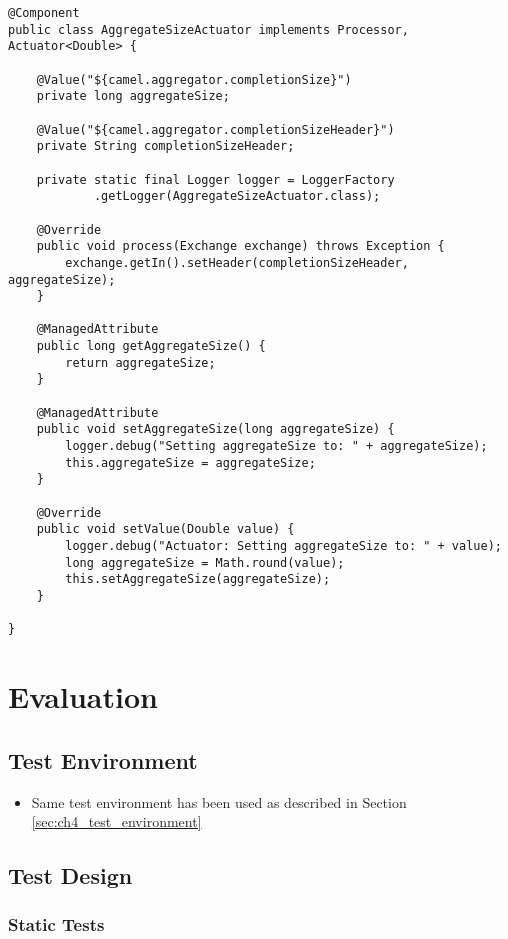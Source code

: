 \begin{lstlisting}[caption={AggregateSizeActuator},label=listing:ch5_aggregateSizeActuator]
@Component
public class AggregateSizeActuator implements Processor, Actuator<Double> {

	@Value("${camel.aggregator.completionSize}")
	private long aggregateSize;
	
	@Value("${camel.aggregator.completionSizeHeader}")
	private String completionSizeHeader;
	
	private static final Logger logger = LoggerFactory
			.getLogger(AggregateSizeActuator.class);
	
	@Override
	public void process(Exchange exchange) throws Exception {
		exchange.getIn().setHeader(completionSizeHeader, aggregateSize);
	}

	@ManagedAttribute
	public long getAggregateSize() {
		return aggregateSize;
	}

	@ManagedAttribute
	public void setAggregateSize(long aggregateSize) {
		logger.debug("Setting aggregateSize to: " + aggregateSize);
		this.aggregateSize = aggregateSize;
	}

	@Override
	public void setValue(Double value) {
		logger.debug("Actuator: Setting aggregateSize to: " + value);
		long aggregateSize = Math.round(value);
		this.setAggregateSize(aggregateSize);
	}

}

\end{lstlisting}

\section{Evaluation}

\subsection{Test Environment}

\begin{itemize}
	\item Same test environment has been used as described in Section \ref{sec:ch4_test_environment}
\end{itemize}

\subsection{Test Design}

\subsubsection{Static Tests}

